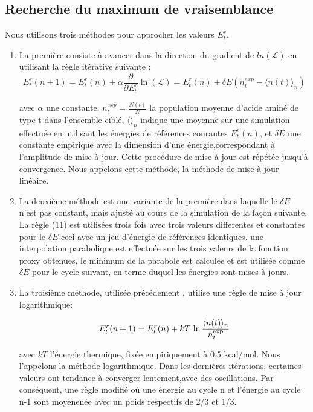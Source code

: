 \subsection{Recherche du maximum de vraisemblance}


Nous utilisons trois méthodes pour approcher les valeurs ${E^r_t}$.

\begin{enumerate}
\item La première consiste à avancer dans la direction du gradient de $ln(\mathcal{L})$ en utilisant la règle itérative suivante \cite{Kleinman06}:
\begin{equation} \label {eq: linear}
  E^r_t(n+1) = E^r_t(n) + \alpha \frac{\partial}{\partial E^r_t} \ln(\mathcal{L})=E^r_t(n) + \delta E (n^{exp}_t - \langle n(t)\rangle_n)
\end{equation} 

avec $\alpha$ une constante, $n^{exp}_t = \frac{N(t)}{N}$ la population moyenne d'acide aminé de type t dans l'ensemble ciblé,
$\langle\rangle_n$ indique une moyenne sur une simulation effectuée en utilisant les énergies de références courantes ${E^r_t(n)}$, et $\delta E$ une constante empirique avec la dimension d'une énergie,correspondant à l'amplitude de mise à jour. Cette procédure de mise à jour est répétée jusqu'à convergence. Nous appelons cette méthode, la méthode de mise à jour linéaire.

\item La deuxième méthode est une variante de la première dans laquelle le $\delta E$ n'est pas constant, mais ajusté au cours de la simulation de la façon suivante. La règle (11) est utilisées trois fois avec trois valeurs differentes et constantes pour le $\delta E$ ceci avec un jeu d'énergie de références identiques. une interpolation parabolique est effectuée sur les trois valeurs de la fonction proxy obtenues, le minimum de la parabole est calculée et est utilisée comme $\delta E$ pour le cycle suivant, en terme duquel les énergies sont mises à jours.

\item La troisième méthode, utilisée précédement \cite{Schmidt08,Simonson13b}, utilise une règle de mise à jour logarithmique:

  \begin{equation} \label{eq:log}
E^r_t (n+1) = E^r_t (n) + kT \, \ln \frac{\langle n(t) \rangle_n}{n_t^{\rm exp}}
\end{equation}


  avec $kT$ l'énergie thermique, fixée empiriquement à 0,5 kcal/mol. Nous l'appelons la méthode logarithmique. Dans les dernières itérations, certaines valeurs ont tendance à converger lentement,avec des oscillations. Par conséquent, une règle modifié où une énergie au cycle n et l'énergie au cycle  n-1 sont moyenenée avec un poids respectifs de 2/3 et 1/3.

\end{enumerate}
 
